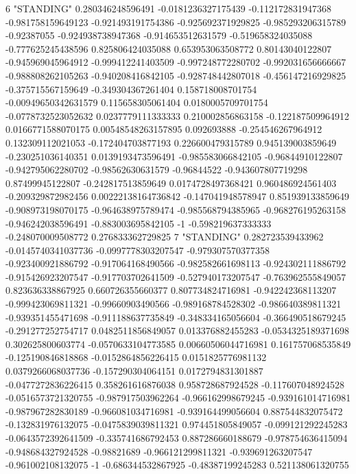 6 "STANDING" 0.280346248596491 -0.0181236327175439 -0.112172831947368 -0.981758159649123 -0.921493191754386 -0.925692371929825 -0.985293206315789 -0.92387055 -0.924938738947368 -0.914653512631579 -0.519658324035088 -0.777625245438596 0.825806424035088 0.653953063508772 0.80143040122807 -0.945969045964912 -0.999412241403509 -0.997248772280702 -0.992031656666667 -0.988808262105263 -0.940208416842105 -0.928748442807018 -0.456147216929825 -0.375715567159649 -0.349304367261404 0.158718008701754 -0.00949650342631579 0.115658305061404 0.0180005709701754 -0.0778732523052632 0.0237779111333333 0.210002856863158 -0.122187509964912 0.0166771588070175 0.00548548263157895 0.092693888 -0.254546267964912 0.132309112021053 -0.172404703877193 0.226600479315789 0.945139003859649 -0.230251036140351 0.0139193473596491 -0.985583066842105 -0.96844910122807 -0.942795062280702 -0.98562630631579 -0.96844522 -0.943607807719298 0.87499945122807 -0.242817513859649 0.0174728497368421 0.960486924561403 -0.209329872982456 0.00222138164736842 -0.147041948578947 0.851939133859649 -0.908973198070175 -0.964638975789474 -0.985568794385965 -0.968276195263158 -0.946242038596491 -0.883003695842105 -1 -0.598219637333333 -0.248070009508772 0.276833362729825
7 "STANDING" 0.282723539433962 -0.0145740341037736 -0.0997778303207547 -0.979307570377358 -0.923400921886792 -0.917064168490566 -0.982582661698113 -0.924302111886792 -0.915426923207547 -0.917703702641509 -0.527940173207547 -0.763962555849057 0.823636338867925 0.660726355660377 0.807734824716981 -0.942242368113207 -0.999423069811321 -0.99660903490566 -0.989168784528302 -0.986640389811321 -0.939351455471698 -0.911188637735849 -0.348334165056604 -0.366490518679245 -0.291277252754717 0.0482511856849057 0.013376882455283 -0.0534325189371698 0.302625800603774 -0.0570633104773585 0.00660506044716981 0.161757068535849 -0.125190846818868 -0.0152864856226415 0.0151825776981132 0.0379266068037736 -0.157290304064151 0.0172794831301887 -0.0477272836226415 0.358261616876038 0.958728687924528 -0.117607048924528 -0.0516573721320755 -0.987917503962264 -0.966162998679245 -0.939161014716981 -0.987967282830189 -0.966081034716981 -0.939164499056604 0.887544832075472 -0.132831976132075 -0.0475839039811321 0.974451805849057 -0.099121292245283 -0.0643572392641509 -0.335741686792453 0.887286660188679 -0.978754636415094 -0.948684327924528 -0.98821689 -0.966121299811321 -0.939691263207547 -0.961002108132075 -1 -0.686344532867925 -0.48387199245283 0.521138061320755
